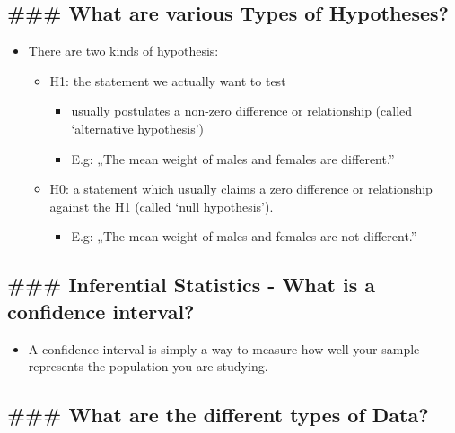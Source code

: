 \documentclass[11pt]{article}
\providecommand{\tightlist}{%
      \setlength{\itemsep}{0pt}\setlength{\parskip}{0pt}}
\begin{document}
    \subsection{\#\#\# What are various Types of
Hypotheses?}\label{what-are-various-types-of-hypotheses}

    \begin{itemize}
\tightlist
\item
  There are two kinds of hypothesis:

  \begin{itemize}
  \tightlist
  \item
    H1: the statement we actually want to test

    \begin{itemize}
    \tightlist
    \item
      usually postulates a non-zero difference or relationship (called
      `alternative hypothesis')
    \item
      E.g: „The mean weight of males and females are different.''
    \end{itemize}
  \item
    H0: a statement which usually claims a zero difference or
    relationship against the H1 (called `null hypothesis').

    \begin{itemize}
    \tightlist
    \item
      E.g: „The mean weight of males and females are not different.''
    \end{itemize}
  \end{itemize}
\end{itemize}

    \subsection{\#\#\# Inferential Statistics - What is a confidence
interval?}\label{inferential-statistics---what-is-a-confidence-interval}

    \begin{itemize}
\tightlist
\item
  A confidence interval is simply a way to measure how well your sample
  represents the population you are studying.
\end{itemize}

    \subsection{\#\#\# What are the different types of
Data?}\label{what-are-the-different-types-of-data}
\end{document}
